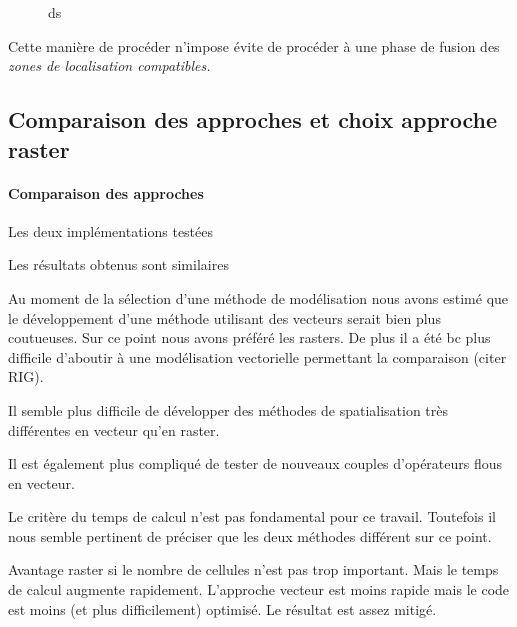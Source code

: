\begin{figure}
  \centering
  
  \caption{ds}
  \label{fig:ds}
\end{figure}

Cette manière de procéder n'impose évite de procéder à une phase de
fusion des \emph{zones de localisation compatibles.}

\subsection{Comparaison des approches et choix approche raster}

\paragraph{Comparaison des approches}

Les deux implémentations testées

Les résultats obtenus sont similaires







Au moment de la sélection d'une méthode de modélisation nous avons
estimé que le développement d'une méthode utilisant des vecteurs
serait bien plus coutueuses. Sur ce point nous avons préféré les
rasters. De plus il a été bc plus difficile d'aboutir à une
modélisation vectorielle permettant la comparaison (citer RIG).


Il semble plus difficile de développer des méthodes de spatialisation
très différentes en vecteur qu'en raster.

Il est également plus compliqué de tester de nouveaux couples
d'opérateurs flous en vecteur.



Le critère du temps de calcul n'est pas fondamental pour ce
travail. Toutefois il nous semble pertinent de préciser que les deux
méthodes différent sur ce point.

Avantage raster si le nombre de cellules n'est pas trop
important. Mais le temps de calcul augmente rapidement. L'approche
vecteur est moins rapide mais le code est moins (et plus
difficilement) optimisé. Le résultat est assez mitigé.

